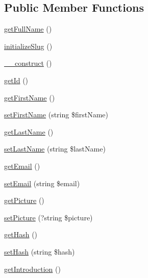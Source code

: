 \subsection*{Public Member Functions}
\begin{DoxyCompactItemize}
\item 
\mbox{\hyperlink{class_app_1_1_entity_1_1_user_a2b284f11184201a8ba8a92de57f93580}{get\+Full\+Name}} ()
\item 
\mbox{\hyperlink{class_app_1_1_entity_1_1_user_a858ff58013625b0534f869b0ce771d29}{initialize\+Slug}} ()
\item 
\mbox{\hyperlink{class_app_1_1_entity_1_1_user_a095c5d389db211932136b53f25f39685}{\+\_\+\+\_\+construct}} ()
\item 
\mbox{\hyperlink{class_app_1_1_entity_1_1_user_a12251d0c022e9e21c137a105ff683f13}{get\+Id}} ()
\item 
\mbox{\hyperlink{class_app_1_1_entity_1_1_user_ace5f32fc99c7c5989f7576755fc60972}{get\+First\+Name}} ()
\item 
\mbox{\hyperlink{class_app_1_1_entity_1_1_user_a4a951776a912492eb02ce00bb0b1e2ce}{set\+First\+Name}} (string \$first\+Name)
\item 
\mbox{\hyperlink{class_app_1_1_entity_1_1_user_a717286a8348a6cf9f6d5fecb04a55fad}{get\+Last\+Name}} ()
\item 
\mbox{\hyperlink{class_app_1_1_entity_1_1_user_a69a8e387abf5660e10ce12c2b85539ea}{set\+Last\+Name}} (string \$last\+Name)
\item 
\mbox{\hyperlink{class_app_1_1_entity_1_1_user_a02a01849f28e2535e888ae4ec87b20f2}{get\+Email}} ()
\item 
\mbox{\hyperlink{class_app_1_1_entity_1_1_user_a2d22391fa86fa0eaf3b9d2a3c29880bc}{set\+Email}} (string \$email)
\item 
\mbox{\hyperlink{class_app_1_1_entity_1_1_user_aa10a041137b00a6f0a79916f4009924f}{get\+Picture}} ()
\item 
\mbox{\hyperlink{class_app_1_1_entity_1_1_user_a67f2c70c37897c81e3e7a5905878e9c6}{set\+Picture}} (?string \$picture)
\item 
\mbox{\hyperlink{class_app_1_1_entity_1_1_user_a10220afb27800deb78f48b4698a74742}{get\+Hash}} ()
\item 
\mbox{\hyperlink{class_app_1_1_entity_1_1_user_a2d4c4083b1005337912b253649056ec9}{set\+Hash}} (string \$hash)
\item 
\mbox{\hyperlink{class_app_1_1_entity_1_1_user_a35d5a57a94ec7eac2f80749ad8e256bd}{get\+Introduction}} ()
\item 

\end{DoxyCompactItemize}
